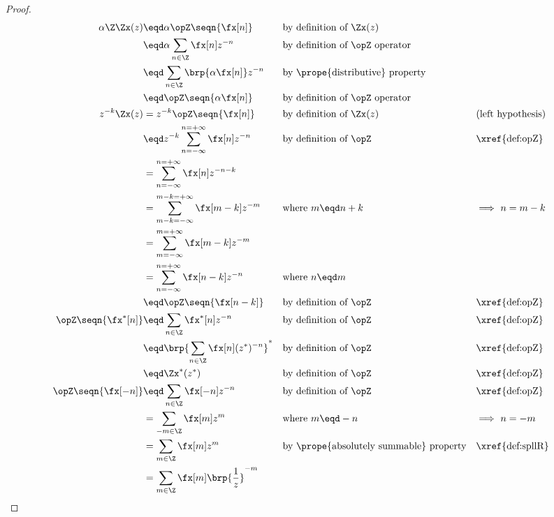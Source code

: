 \begin{proof}
\begin{align*}
  \alpha\Z\Zx(z)
    &\eqd \alpha \opZ \seqn{\fx[n]}                && \text{by definition of $\Zx(z)$}
  \\&\eqd \alpha \sum_{n\in\Z} \fx[n] z^{-n}       && \text{by definition of $\opZ$ operator}
  \\&\eqd \sum_{n\in\Z} \brp{\alpha\fx[n]} z^{-n}  && \text{by \prope{distributive} property}
  \\&\eqd \opZ\seqn{\alpha\fx[n]}                  && \text{by definition of $\opZ$ operator}
  \\
  z^{-k}\Zx(z) 
    &= z^{-k} \opZ\seqn{\fx[n]}
    && \text{by definition of $\Zx(z)$}
    && \text{(left hypothesis)}
  \\&\eqd z^{-k}\sum_{n=-\infty}^{n=+\infty} \fx[n] z^{-n}
    && \text{by definition of $\opZ$}
    && \text{\xref{def:opZ}}
  \\&=          \sum_{n=-\infty}^{n=+\infty} \fx[n] z^{-n-k}
  \\&=          \sum_{m-k=-\infty}^{m-k=+\infty} \fx[m-k] z^{-m}
    && \text{where $m\eqd n+k$}
    && \text{$\implies$ $n=m-k$}
  \\&=          \sum_{m=-\infty}^{m=+\infty} \fx[m-k] z^{-m}
  \\&=          \sum_{n=-\infty}^{n=+\infty} \fx[n-k] z^{-n}
    && \text{where $n\eqd m$}
  \\&\eqd \opZ\seqn{\fx[n-k]}
    && \text{by definition of $\opZ$}
    && \text{\xref{def:opZ}}
  \\
  \opZ\seqn{\fx^\ast[n]}  
    &\eqd \sum_{n\in\Z}\fx^\ast[n] z^{-n}
    && \text{by definition of $\opZ$}
    && \text{\xref{def:opZ}}
  \\&\eqd \brp{\sum_{n\in\Z}\fx[n] (z^\ast)^{-n}}^\ast
    && \text{by definition of $\opZ$}
    && \text{\xref{def:opZ}}
  \\&\eqd \Zx^\ast(z^\ast)
    && \text{by definition of $\opZ$}
    && \text{\xref{def:opZ}}
  \\
  \opZ\seqn{\fx[-n]}  
    &\eqd \sum_{n\in\Z}\fx[-n] z^{-n}
    && \text{by definition of $\opZ$}
    && \text{\xref{def:opZ}}
  \\&= \sum_{-m\in\Z}\fx[m] z^{m}
    && \text{where $m\eqd -n$}
    && \text{$\implies$ $n=-m$}
  \\&= \sum_{m\in\Z}\fx[m] z^{m}
    && \text{by \prope{absolutely summable} property}
    && \text{\xref{def:spllR}}
  \\&= \sum_{m\in\Z}\fx[m] \brp{\frac{1}{z}}^{-m}

\end{align*}
\end{proof}
